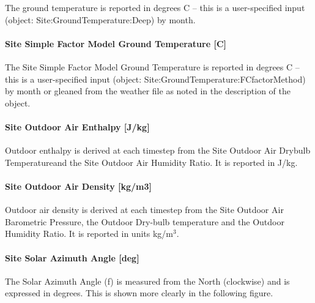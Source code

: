 The ground temperature is reported in degrees C -- this is a user-specified input (object: Site:GroundTemperature:Deep) by month.

\paragraph{Site Simple Factor Model Ground Temperature {[}C{]}}\label{site-simple-factor-model-ground-temperature-c}

The Site Simple Factor Model Ground Temperature is reported in degrees C -- this is a user-specified input (object: Site:GroundTemperature:FCfactorMethod) by month or gleaned from the weather file as noted in the description of the object.

\paragraph{Site Outdoor Air Enthalpy {[}J/kg{]}}\label{site-outdoor-air-enthalpy-jkg}

Outdoor enthalpy is derived at each timestep from the Site Outdoor Air Drybulb Temperatureand the Site Outdoor Air Humidity Ratio. It is reported in J/kg.

\paragraph{Site Outdoor Air Density {[}kg/m3{]}}\label{site-outdoor-air-density-kgm3}

Outdoor air density is derived at each timestep from the Site Outdoor Air Barometric Pressure, the Outdoor Dry-bulb temperature and the Outdoor Humidity Ratio. It is reported in units kg/m\(^{3}\).

\paragraph{Site Solar Azimuth Angle {[}deg{]}}\label{site-solar-azimuth-angle-deg}

The Solar Azimuth Angle (f) is measured from the North (clockwise) and is expressed in degrees. This is shown more clearly in the following figure.

